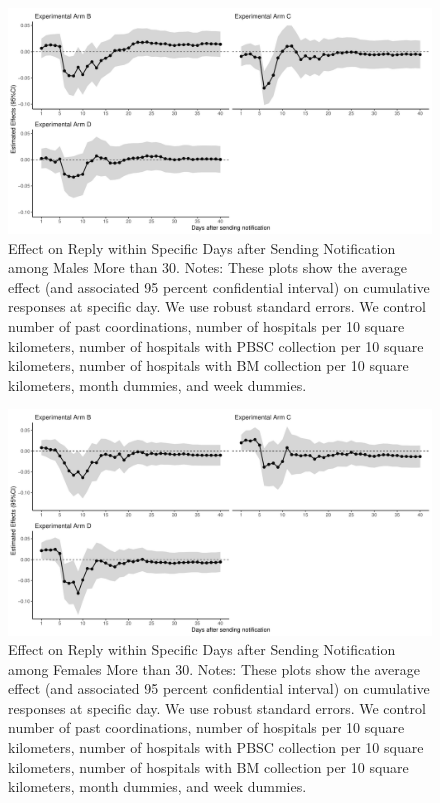 \documentclass[
]{article}
\begin{document}
\begin{figure}[t]
\includegraphics{robustness-body_files/figure-latex/old-male-flow-1} \caption{Effect on Reply within Specific Days after Sending Notification among Males More than 30. Notes: These plots show the average effect (and associated 95 percent confidential interval) on cumulative responses at specific day. We use robust standard errors. We control number of past coordinations, number of hospitals per 10 square kilometers, number of hospitals with PBSC collection per 10 square kilometers, number of hospitals with BM collection per 10 square kilometers, month dummies, and week dummies.}\label{fig:old-male-flow}
\end{figure}

\begin{figure}[t]
\includegraphics{robustness-body_files/figure-latex/old-female-flow-1} \caption{Effect on Reply within Specific Days after Sending Notification among Females More than 30. Notes: These plots show the average effect (and associated 95 percent confidential interval) on cumulative responses at specific day. We use robust standard errors. We control number of past coordinations, number of hospitals per 10 square kilometers, number of hospitals with PBSC collection per 10 square kilometers, number of hospitals with BM collection per 10 square kilometers, month dummies, and week dummies.}\label{fig:old-female-flow}
\end{figure}
\end{document}
